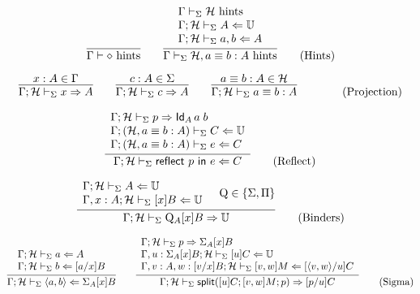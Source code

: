 \documentclass{amsart}
\begin{document}
\begin{equation}
  \infer{\Gamma\vdash \emp\hints}{}
  \qquad
  \infer{
    \Gamma\vdash_\Sigma \mathcal{H}, a\equiv b:A\hints
  }{
    \begin{array}{l}
      \Gamma\vdash_\Sigma \mathcal{H}\hints\\
      \Gamma;\mathcal{H}\vdash_\Sigma A\checks\uni\\
      \Gamma;\mathcal{H}\vdash_\Sigma a,b\checks A
    \end{array}
  }
  \tag{Hints}
\end{equation}

\begin{equation}
  \infer{
    \Gamma;\mathcal{H}\vdash_\Sigma x\infers A
  }{
    x:A\in\Gamma
  }
  \qquad
  \infer{
    \Gamma;\mathcal{H}\vdash_\Sigma c\infers A
  }{
    c:A\in\Sigma
  }
  \qquad
  \infer{
    \Gamma;\mathcal{H}\vdash_\Sigma a\equiv b:A
  }{
    a\equiv b:A \in \mathcal{H}
  }
  \qquad
  \tag{Projection}
\end{equation}

\begin{equation}
  \infer{
    \Gamma;\mathcal{H}\vdash_\Sigma \mathsf{reflect}\ p\ \mathsf{in}\ e \checks C
  }{
    \begin{array}{l}
      \Gamma;\mathcal{H}\vdash_\Sigma p \infers \mathsf{Id}_A\,a\;b\\
      \Gamma;(\mathcal{H}, a\equiv b:A)\vdash_\Sigma C\checks\uni\\
      \Gamma;(\mathcal{H}, a\equiv b:A)\vdash_\Sigma e \checks C
    \end{array}
  }
  \tag{Reflect}
\end{equation}

\begin{equation}
  \infer{
    \Gamma;\mathcal{H}\vdash_\Sigma\mathrm{Q}_A[x]B\infers\uni
  }{
    \begin{array}{l}
      \Gamma;\mathcal{H}\vdash_\Sigma A \checks\uni\\
      \Gamma,x:A;\mathcal{H}\vdash_\Sigma [x]B\checks\uni
    \end{array} &
    \mathrm{Q} \in \{ \Sigma, \Pi \}
  }
  \tag{Binders}
\end{equation}

\begin{equation}
  \infer{
    \Gamma;\mathcal{H}\vdash_\Sigma \langle a,b\rangle \checks \Sigma_A[x]B
  }{
    \begin{array}{l}
      \Gamma;\mathcal{H}\vdash_\Sigma a\checks A\\
      \Gamma;\mathcal{H}\vdash_\Sigma b\checks [a/x]B
    \end{array}
  }
  \qquad
  \infer{
    \Gamma;\mathcal{H}\vdash_\Sigma \mathsf{split}([u]C; [v,w]M; p)\infers [p/u]C
  }{
    \begin{array}{l}
      \Gamma;\mathcal{H}\vdash_\Sigma p\infers \Sigma_A[x]B\\
      \Gamma,u:\Sigma_A[x]B;\mathcal{H}\vdash_\Sigma [u]C\checks\uni\\
      \Gamma,v:A,w:[v/x]B;\mathcal{H}\vdash_\Sigma [v,w]M\checks[\langle v,w\rangle/u]C
    \end{array}
  }
  \tag{Sigma}
\end{equation}
\end{document}
